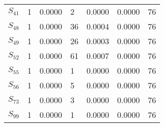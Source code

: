 \begin{xltabular}{\textwidth}{XPPPPPP}
  $S_{41}$ & 1 & 0.0000 & 2 & 0.0000 & 0.0000 & 76 \\ 
  $S_{48}$ & 1 & 0.0000 & 36 & 0.0004 & 0.0000 & 76 \\ 
  $S_{49}$ & 1 & 0.0000 & 26 & 0.0003 & 0.0000 & 76 \\ 
  $S_{52}$ & 1 & 0.0000 & 61 & 0.0007 & 0.0000 & 76 \\ 
  $S_{55}$ & 1 & 0.0000 & 1 & 0.0000 & 0.0000 & 76 \\ 
  $S_{56}$ & 1 & 0.0000 & 5 & 0.0000 & 0.0000 & 76 \\ 
  $S_{73}$ & 1 & 0.0000 & 3 & 0.0000 & 0.0000 & 76 \\ 
  $S_{99}$ & 1 & 0.0000 & 1 & 0.0000 & 0.0000 & 76 \\
        \bottomrule
    \end{xltabular}
    